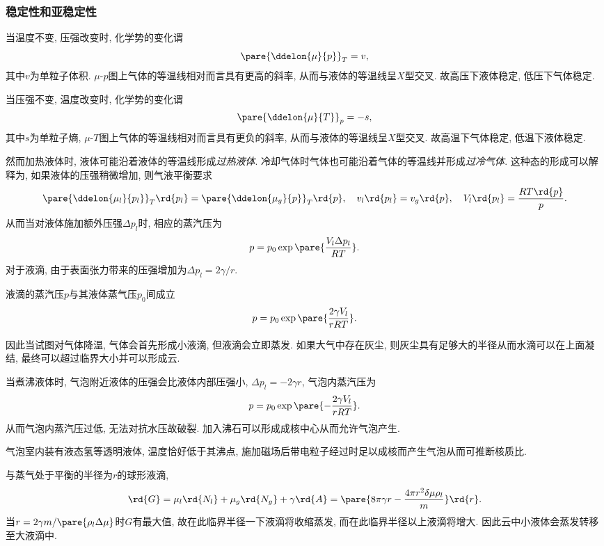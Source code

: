 \documentclass[../Thermal.tex]{subfiles}
\begin{document}
\subsubsection{稳定性和亚稳定性}
当温度不变, 压强改变时, 化学势的变化谓
\[ \pare{\ddelon{\mu}{p}}_T = v, \]
其中$v$为单粒子体积. $\mu$-$p$图上气体的等温线相对而言具有更高的斜率, 从而与液体的等温线呈$X$型交叉. 故高压下液体稳定, 低压下气体稳定.
\par
当压强不变, 温度改变时, 化学势的变化谓
\[ \pare{\ddelon{\mu}{T}}_p = -s, \]
其中$s$为单粒子熵, $\mu$-$T$图上气体的等温线相对而言具有更负的斜率, 从而与液体的等温线呈$X$型交叉. 故高温下气体稳定, 低温下液体稳定.
\par
然而加热液体时, 液体可能沿着液体的等温线形成\emph{过热液体}. 冷却气体时气体也可能沿着气体的等温线并形成\emph{过冷气体}. 这种态的形成可以解释为, 如果液体的压强稍微增加, 则气液平衡要求
\[ \pare{\ddelon{\mu_l}{p_l}}_T \rd{p_l} = \pare{\ddelon{\mu_g}{p}}_T\rd{p},\quad v_l\rd{p_l} = v_g\rd{p},\quad V_l\rd{p_l} = \frac{RT\rd{p}}{p}. \]
从而当对液体施加额外压强$\Delta p_l$时, 相应的蒸汽压为
\[ p = p_0 \exp\pare{\frac{V_l\Delta p_l}{RT}}. \]
对于液滴, 由于表面张力带来的压强增加为$\Delta p_l = 2\gamma/r$.
\begin{finale}
\begin{theorem}[Kelvin公式]
液滴的蒸汽压$p$与其液体蒸气压$p_0$间成立
\[ p = p_0\exp\pare{\frac{2\gamma V_l}{rRT}}. \]
\end{theorem}
\end{finale}
因此当试图对气体降温, 气体会首先形成小液滴, 但液滴会立即蒸发. 如果大气中存在灰尘, 则灰尘具有足够大的半径从而水滴可以在上面凝结, 最终可以超过临界大小并可以形成云.
\par
当煮沸液体时, 气泡附近液体的压强会比液体内部压强小, $\Delta p_l = -2\gamma r$, 气泡内蒸汽压为
\[ p = p_0\exp\pare{-\frac{2\gamma V_l}{rRT}}. \]
从而气泡内蒸汽压过低, 无法对抗水压故破裂. 加入沸石可以形成成核中心从而允许气泡产生.
\begin{ex}
气泡室内装有液态氢等透明液体, 温度恰好低于其沸点, 施加磁场后带电粒子经过时足以成核而产生气泡从而可推断核质比.
\end{ex}
\begin{ex}
与蒸气处于平衡的半径为$r$的球形液滴,
\[ \rd{G} = \mu_l\rd{N_l} + \mu_g\rd{N_g} + \gamma\rd{A} = \pare{8\pi \gamma r - \frac{4\pi r^2 \delta\mu\rho_l}{m}}\rd{r}. \]
当$r=2\gamma m /\pare{\rho_l\Delta \mu}$时$G$有最大值, 故在此临界半径一下液滴将收缩蒸发, 而在此临界半径以上液滴将增大. 因此云中小液体会蒸发转移至大液滴中.
\end{ex}
\end{document}
